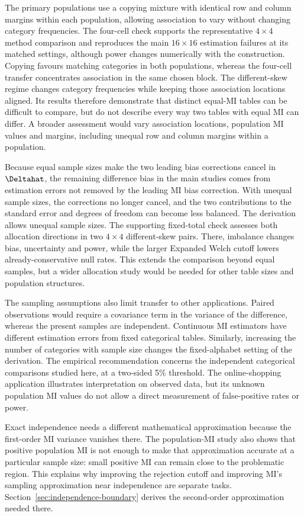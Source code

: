 The primary populations use a copying mixture with identical row and
column margins within each population, allowing association to vary
without changing category frequencies. The four-cell check
supports the representative \(4\times4\) method comparison and
reproduces the main \(16\times16\) estimation failures at its matched
settings, although power changes numerically with the construction.
Copying favours matching categories in both
populations, whereas the four-cell transfer concentrates association
in the same chosen block. The different-skew regime changes category
frequencies while keeping those association locations aligned. Its
results therefore demonstrate that distinct equal-MI tables can be
difficult to compare, but do not describe every way two tables with
equal MI can differ. A broader assessment would vary association
locations, population MI values and margins, including unequal
row and column margins within a population.

Because equal sample sizes make the two leading bias corrections cancel
in \(\Deltahat\), the remaining difference bias in the main studies
comes from estimation errors not
removed by the leading MI bias correction. With unequal sample sizes, the
corrections no longer cancel, and the two contributions to the standard
error and degrees of freedom can become less balanced. The derivation
allows unequal sample sizes. The supporting fixed-total check assesses
both allocation directions in two \(4\times4\) different-skew pairs.
There, imbalance changes bias, uncertainty and power, while the
larger Expanded Welch cutoff lowers already-conservative null rates.
This extends the comparison beyond equal samples, but a wider allocation
study would be needed for other table sizes and population structures.

The sampling assumptions also limit transfer to other applications.
Paired observations would require a covariance term in the variance of
the difference, whereas the present samples are independent. Continuous
MI estimators have different estimation errors from fixed categorical
tables. Similarly, increasing the number of categories with sample size
changes the fixed-alphabet setting of the derivation. The empirical
recommendation concerns the independent categorical comparisons studied
here, at a two-sided 5\% threshold. The online-shopping application
illustrates interpretation on observed data, but its unknown population
MI values do not allow a direct measurement of false-positive rates or power.

Exact independence needs a different mathematical approximation because
the first-order MI variance vanishes there. The population-MI
study also shows that positive population MI is not enough to make that
approximation accurate at a particular sample size: small positive MI
can remain close to the problematic region. This explains why improving
the rejection cutoff and improving MI's sampling approximation near independence
are separate tasks.
Section~\ref{sec:independence-boundary} derives the second-order
approximation needed there.

